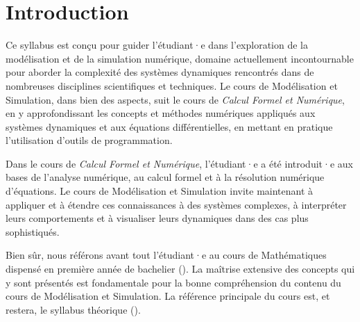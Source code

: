\chapter{Introduction}
    Ce syllabus est conçu pour guider l'étudiant·e dans l’exploration de la modélisation et de la simulation numérique, domaine actuellement incontournable pour aborder la complexité des systèmes dynamiques rencontrés dans de nombreuses disciplines scientifiques et techniques. Le cours de Modélisation et Simulation, dans bien des aspects, suit le cours de \textit{Calcul Formel et Numérique}, en y approfondissant les concepts et méthodes numériques appliqués aux systèmes dynamiques et aux équations différentielles, en mettant en pratique l'utilisation d’outils de programmation.

    Dans le cours de \textit{Calcul Formel et Numérique}, l'étudiant·e a été introduit·e aux bases de l’analyse numérique, au calcul formel et à la résolution numérique d’équations. Le cours de Modélisation et Simulation invite maintenant à appliquer et à étendre ces connaissances à des systèmes complexes, à interpréter leurs comportements et à visualiser leurs dynamiques dans des cas plus sophistiqués.

    Bien sûr, nous référons avant tout l'étudiant·e au cours de Mathématiques dispensé en première année de bachelier (\cite{mathf117}). La maîtrise extensive des concepts qui y sont présentés est fondamentale pour la bonne compréhension du contenu du cours de Modélisation et Simulation. La référence principale du cours est, et restera, le syllabus théorique (\cite{infof305}).

